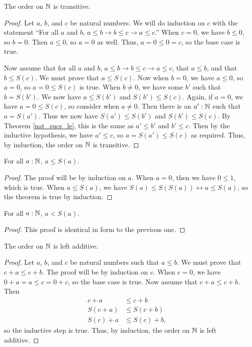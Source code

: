 \documentclass[../math.tex]{subfiles}
\begin{document}
\begin{instance}
    The order on $\mathbb{N}$ is transitive.
\end{instance}
\begin{proof}
    Let $a$, $b$, and $c$ be natural numbers.  We will do induction on $c$ with
    the statement ``For all $a$ and $b$, $a \leq b \rightarrow b \leq c
    \rightarrow a \leq c$.''  When $c = 0$, we have $b \leq 0$, so $b = 0$.
    Then $a \leq 0$, so $a = 0$ as well.  Thus, $a = 0 \leq 0 = c$, so the base
    case is true.

    Now assume that for all $a$ and $b$, $a \leq b \rightarrow b \leq c
    \rightarrow a \leq c$, that $a \leq b$, and that $b \leq S(c)$.  We must
    prove that $a \leq S(c)$.  Now when $b = 0$, we have $a \leq 0$, so $a = 0$,
    so $a = 0 \leq S(c)$ is true.  When $b \neq 0$, we have some $b'$ such that
    $b = S(b')$.  We now have $a \leq S(b')$ and $S(b') \leq S(c)$.  Again, if
    $a = 0$, we have $a = 0 \leq S(c)$, so consider when $a \neq 0$.  Then there
    is an $a' : \mathbb{N}$ such that $a = S(a')$.  Thus we now have $S(a') \leq S(b')$
    and $S(b') \leq S(c)$.  By Theorem \ref{nat_sucs_le}, this is the same as
    $a' \leq b'$ and $b' \leq c$.  Then by the inductive hypothesis, we have $a'
    \leq c$, so $a = S(a') \leq S(c)$ as required.  Thus, by induction, the
    order on $\mathbb{N}$ is transitive.
\end{proof}

\begin{theorem} \label{nat_le_suc}
    For all $a : \mathbb{N}$, $a \leq S(a)$.
\end{theorem}
\begin{proof}
    The proof will be by induction on $a$.  When $a = 0$, then we have $0 \leq
    1$, which is true.  When $a \leq S(a)$, we have $S(a) \leq S(S(a))
    \leftrightarrow a \leq S(a)$, so the theorem is true by induction.
\end{proof}

\begin{theorem} \label{nat_lt_suc}
    For all $a : \mathbb{N}$, $a < S(a)$.
\end{theorem}
\begin{proof}
    This proof is identical in form to the previous one.
\end{proof}

\begin{instance}
    The order on $\mathbb{N}$ is left additive.
\end{instance}
\begin{proof}
    Let $a$, $b$, and $c$ be natural numbers such that $a \leq b$.  We must
    prove that $c + a \leq c + b$.  The proof will be by induction on $c$.  When
    $c = 0$, we have $0 + a = a \leq c = 0 + c$, so the base case is true.  Now
    assume that $c + a \leq c + b$.  Then
    \begin{align*}
        c + a &\leq c + b \\
        S(c + a) &\leq S(c + b) \\
        S(c) + a &\leq S(c) + b,
    \end{align*}
    so the inductive step is true.  Thus, by induction, the order on $\mathbb{N}$ is
    left additive.
\end{proof}
\end{document}
